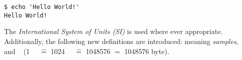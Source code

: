 \begin{lstlisting}[style=Shell]
$ echo 'Hello World!'
Hello World!
\end{lstlisting}

The \emph{International System of Units (SI)} is used where ever appropriate.
Additionally, the following new definitions are introduced: \si{\samples}
meaning \emph{samples}, \si{\mebi\byte} and \si{\kibi\byte} (\SI{1}{\mebi\byte}
$\hat{=}$ \SI{1024}{\kibi\byte} $\hat{=}$ \SI{1048576}{\byte} $=$ 1048576 byte).



